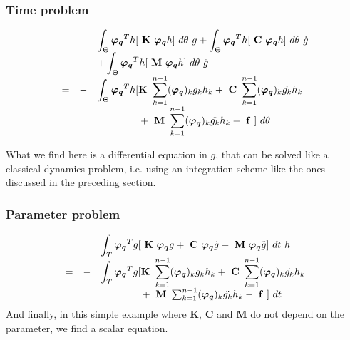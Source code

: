\documentclass[12pt,a4paper]{article}
\begin{document}
\subsubsection{Time problem}

\begin{equation}
\begin{array}{r r l}
	&& \displaystyle
		\int_\Theta		
			\boldsymbol{\varphi_q}^Th [    ~\mathbf{K}~ \boldsymbol{\varphi_q}h ] ~d\theta
	~g
	+ 
		\int_\Theta		
			\boldsymbol{\varphi_q}^Th [ ~\mathbf{C}~ \boldsymbol{\varphi_q}h ] ~d\theta
	  ~\dot{g}
	\\ && \displaystyle	
	+ 
		\int_\Theta		
			\boldsymbol{\varphi_q}^Th [ ~\mathbf{M}~ \boldsymbol{\varphi_q}h ] ~d\theta
	  ~\ddot{g}
	\\
	= &-& \displaystyle
		\int_\Theta		
			\boldsymbol{\varphi_q}^Th [  \mathbf{K}~ \sum_{k=1}^{n-1} (\boldsymbol{\varphi_q})_k       g_k  h_k 
				+ ~\mathbf{C}~ \sum_{k=1}^{n-1} (\boldsymbol{\varphi_q})_k  \dot{g_k} h_k 

	\\ && \displaystyle
			\phantom{\int_\Theta		
			\boldsymbol{\varphi_q}^Th [  }
				+ ~\mathbf{M}~ \sum_{k=1}^{n-1} (\boldsymbol{\varphi_q})_k \ddot{g_k} h_k
				- ~\mathbf{f}~ ] ~d\theta
\end{array}
\end{equation}

What we find here is a differential equation in $g$, that can be solved like a classical dynamics problem, i.e. using an integration scheme like the ones discussed in the preceding section. 

\subsubsection{Parameter problem}

\begin{equation}
\begin{array}{r r l}
	&& \displaystyle
		\int_T
			\boldsymbol{\varphi_q}^Tg [  ~\mathbf{K}~ \boldsymbol{\varphi_q} g
				+ ~\mathbf{C}~ \boldsymbol{\varphi_q} \dot{g}
				+ ~\mathbf{M}~ \boldsymbol{\varphi_q} \ddot{g}
				] ~dt
	~ h
	\\
	= &-& \displaystyle
		\int_T
			\boldsymbol{\varphi_q}^Tg [  \mathbf{K}~ \sum_{k=1}^{n-1} (\boldsymbol{\varphi_q})_k       g_k  h_k 
				+ ~\mathbf{C}~ \sum_{k=1}^{n-1} (\boldsymbol{\varphi_q})_k  \dot{g_k} h_k 

		\\ &&
		\phantom{\int_T \boldsymbol{\varphi_q}^Tg [ }
				+ ~\mathbf{M}~ \sum_{k=1}^{n-1} (\boldsymbol{\varphi_q})_k \ddot{g_k} h_k
				- ~\mathbf{f}~] ~dt
\end{array}
\end{equation}
And finally, in this simple example where $\mathbf{K}$, $\mathbf{C}$ and $\mathbf{M}$ do not depend on the parameter, we find a scalar equation.
\end{document}
